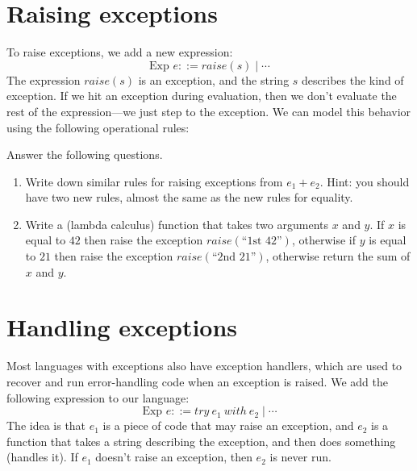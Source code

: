 \documentclass{article}
\begin{document}
\section{Raising exceptions}

To raise exceptions, we add a new expression:
%
\[
  \text{Exp } e ::= \mathit{raise}(s) \mid \cdots
\]
%
The expression $\mathit{raise}(s)$ is an exception, and the string $s$ describes
the kind of exception. If we hit an exception during evaluation, then we don't
evaluate the rest of the expression---we just step to the exception. We can
model this behavior using the following operational rules:
%
%
Answer the following questions.
%
\begin{enumerate}
  \item Write down similar rules for raising exceptions from $e_1 + e_2$. Hint:
    you should have two new rules, almost the same as the new rules for equality.
  \item Write a (lambda calculus) function that takes two arguments $x$ and $y$.
    If $x$ is equal to $42$ then raise the exception
    $\mathit{raise}(\text{``1st 42''})$, otherwise if $y$ is equal to $21$ then
    raise the exception $\mathit{raise}(\text{``2nd 21''})$, otherwise return
    the sum of $x$ and $y$.
\end{enumerate}

\section{Handling exceptions}

Most languages with exceptions also have exception handlers, which are used to
recover and run error-handling code when an exception is raised. We add the
following expression to our language:
%
\[
  \text{Exp } e ::= \mathit{try}~e_1~\mathit{with}~e_2 \mid \cdots
\]
%
The idea is that $e_1$ is a piece of code that may raise an exception, and $e_2$
is a function that takes a string describing the exception, and then does
something (handles it). If $e_1$ doesn't raise an exception, then $e_2$ is never
run.
\end{document}

